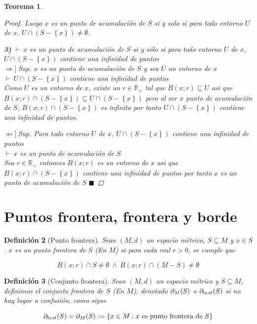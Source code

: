 \documentclass[oneside]{book} %
\theoremstyle{Teorema}
\newtheorem{Definicion}{Definición}[chapter]
\newtheorem{Teorema}[Definicion]{Teorema}
\theoremstyle{Ejemplos}
\theoremstyle{[Obs]}
\def \test {test}
\newcommand{\frontera}[2][\test]{\ifx \test #1 {\partial(#2)} \else {\partial_{#1}(#2)} \fi} %
\renewcommand{\{}{\left\lbrace} %
\renewcommand{\}}{\right\rbrace} %
\newcommand{\y}{\ \wedge\ } %
\newcommand{\n}{\cap} %
\renewcommand{\sc}{\subseteq} %
\newcommand{\R}{\mathbb{R}} %
\renewcommand{\qed}{$\blacksquare$} %
\newcommand{\pd}{$\vdash\ $} %
\newcommand{\necesidad}{$\Rightarrow]\ $} %
\newcommand{\suficiencia}{$\Leftarrow]\ $} %
\begin{document}
\begin{Teorema}
\begin{proof}
					Luego $x$ es un punto de acumulación de $S$ si y solo si para todo entorno $U$ de $x$, $U \n (S - \{ x \}) \neq \emptyset$.

					\textbf{3)} \pd $x$ es un punto de acumulación de $S$ si y sólo si para todo entorno $U$ de $x$, $U \n (S - \{ x \})$ contiene una infinidad de puntos \\ 
					\necesidad Sup. $x$ es un punto de acumulación de $S$ y sea $U$ un entorno de $x$ \\ 
					\pd $U \n (S - \{ x \})$ contiene una infinidad de puntos \\ 
					Como $U$ es un entorno de $x$, existe un $r \in \R_{+}$ tal que $B(x;r) \sc U$ asi que $B(x;r) \n (S - \{ x \}) \sc U \n (S - \{ x \})$ pero al ser $x$ punto de acumulación de $S$, $B(x;r) \n (S - \{ x \})$ es infinito por tanto $U \n (S - \{ x \})$ contiene una infinidad de puntos.

					\suficiencia Sup. Para todo entorno $U$ de $x$, $U \n (S - \{ x \})$ contiene una infinidad de puntos \\ 
					\pd $x$ es un punto de acumulación de $S$ \\ 
					Sea $r \in \R_{+}$ entonces $B(x;r)$ es un entorno de $x$ asi que $B(x;r) \n (S - \{ x \})$ contiene una infinidad de puntos por tanto $x$ es un punto de acumulación de $S$ \qed

				\end{proof}

			\end{Teorema}

		\section{Puntos frontera, frontera y borde}	

			\begin{Definicion}[Punto frontera]\setlength{\parindent}{0em}
				
				Sean $(M, d)$ un espacio métrico, $S \sc M$ y $x \in S$. $x$ es un punto frontera de $S$ (En $M$) si para cada real $r > 0$, se cumple que
				
				\[ B(x;r) \n S \neq \emptyset \y B(x;r) \n (M - S) \neq \emptyset \] 

			\end{Definicion}

			\begin{Definicion}[Conjunto frontera]\setlength{\parindent}{0em}

				Sean $(M, d)$ un espacio métrico y $S \sc M$, definimos el conjunto frontera de $S$ (En $M$), denotado $\frontera[M]{S}$ o $\frontera{S}$ si no hay lugar a confusión, como sigue
				
				\[ \frontera{S} = \frontera[M]{S} := \{ x \in M : x \text{ es punto frontera de } S \} \] 

			\end{Definicion}
\end{document}
